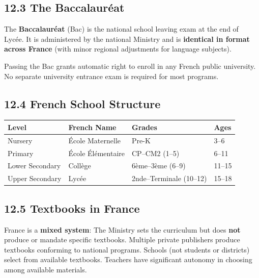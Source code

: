 	\subsection{12.3 The Baccalauréat}

	The \textbf{Baccalauréat} (Bac) is the national school leaving exam at the end of Lycée. It is administered by the national Ministry and is \textbf{identical in format across France} (with minor regional adjustments for language subjects).

	Passing the Bac grants automatic right to enroll in any French public university. No separate university entrance exam is required for most programs.


\subsection{12.4 French School Structure}

\begin{center}\small
	\begin{tabularx}{0.97\textwidth}{@{} l l l l @{}}
		\toprule
		\textbf{Level}  & \textbf{French Name} & \textbf{Grades}          & \textbf{Ages} \\
		\midrule
		Nursery         & École Maternelle     & Pre-K                    & 3--6          \\
		Primary         & École Élémentaire    & CP--CM2 (1--5)           & 6--11         \\
		Lower Secondary & Collège              & 6ème--3ème (6--9)        & 11--15        \\
		Upper Secondary & Lycée                & 2nde--Terminale (10--12) & 15--18        \\
		\bottomrule
	\end{tabularx}
\end{center}


	\subsection{12.5 Textbooks in France}

	France is a \textbf{mixed system}: The Ministry sets the curriculum but does \textbf{not} produce or mandate specific textbooks. Multiple private publishers produce textbooks conforming to national programs. Schools (not students or districts) select from available textbooks. Teachers have significant autonomy in choosing among available materials.

